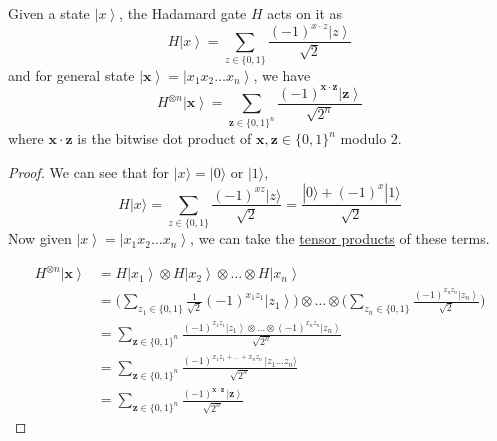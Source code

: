 \documentclass{article}
\newcommand{\ket}[1]{\ensuremath{\left|#1\right\rangle}}
\begin{document}
    \begin{lemma}
      \label{thm:action-of-the-hadamard-gate}
      Given a state $\ket{x}$, the Hadamard gate $H$ acts on it as 
      \begin{equation} 
        H \ket{x} = \sum_{z \in \{0, 1\}} \frac{(-1)^{x \cdot z} \ket{z}}{\sqrt{2}} 
      \end{equation}
      and for general state $\ket{\mathbf{x}} = \ket{x_1 x_2 \ldots x_n}$, we have 
      \begin{equation} 
        H^{\otimes n} \ket{\mathbf{x}} = \sum_{\mathbf{z} \in \{0, 1\}^n} \frac{(-1)^{\mathbf{x} \cdot \mathbf{z}} \ket{\mathbf{z}}}{\sqrt{2^n}}
      \end{equation}
      where $\mathbf{x} \cdot \mathbf{z}$ is the bitwise dot product of $\mathbf{x}, \mathbf{z} \in \{0, 1\}^n$ modulo $2$. 
    \end{lemma}
    \begin{proof} 
      We can see that for $|x\rangle = |0\rangle$ or $|1\rangle$, 
      \begin{equation} 
        H|x\rangle = \sum_{z \in \{0, 1\}} \frac{(-1)^{xz} |z\rangle}{\sqrt{2}} = \frac{|0\rangle + (-1)^x |1\rangle}{\sqrt{2}}
      \end{equation}
      Now given $\ket{x} = \ket{x_1 x_2 \ldots x_n}$, we can take the \hyperref[sm-def:tensor-product]{tensor products} of these terms. 

      \begin{align*} 
        H^{\otimes n} \ket{\mathbf{x}} 
        & = H \ket{x_1} \otimes H \ket{x_2} \otimes \ldots \otimes H \ket{x_n} \\
        & = \bigg( \sum_{z_1 \in \{0, 1\}} \frac{1}{\sqrt{2}} (-1)^{x_1 z_1} \ket{z_1} \bigg) \otimes \ldots \otimes \bigg( \sum_{z_n \in \{0, 1\}} \frac{(-1)^{x_n z_n} \ket{z_n}}{\sqrt{2}} \bigg) \\
        & = \sum_{\mathbf{z} \in \{0, 1\}^n} \frac{(-1)^{x_1 z_1} \ket{z_1} \otimes \ldots \otimes (-1)^{x_n z_n} \ket{z_n}}{\sqrt{2^n}} \\
        & = \sum_{\mathbf{z} \in \{0, 1\}^n} \frac{(-1)^{x_1 z_1 + \ldots + x_n z_n} \, |z_1 \ldots z_n \rangle}{\sqrt{2^n}} \\
        & = \sum_{\mathbf{z} \in \{0, 1\}^n} \frac{(-1)^{\mathbf{x} \cdot \mathbf{z}} \, \ket{\mathbf{z}}}{\sqrt{2^n}}
      \end{align*}
    \end{proof}
\end{document}
